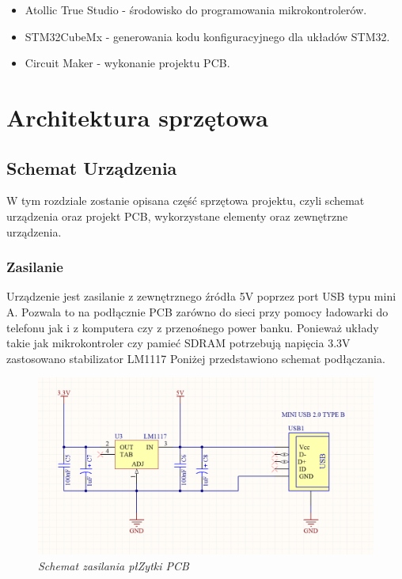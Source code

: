 \documentclass[eng,printmode]{mgr}
\begin{document}
\begin{itemize}
  \item Atollic True Studio - środowisko do programowania mikrokontrolerów.
  \item STM32CubeMx - generowania kodu konfiguracyjnego dla układów STM32.
  \item Circuit Maker - wykonanie projektu PCB.
\end{itemize}

\chapter{ Architektura sprzętowa}



\section{ Schemat Urządzenia}
W tym rozdziale zostanie opisana czę\'s\'c sprzętowa projektu, czyli schemat urządzenia oraz projekt PCB, wykorzystane elementy oraz zewnętrzne urządzenia.
\subsection{Zasilanie}
Urządzenie jest zasilanie z zewnętrznego źródła 5V poprzez port USB typu mini A. Pozwala to na podłącznie PCB zarówno do sieci przy pomocy ładowarki do telefonu jak i z komputera czy z przenośnego power banku. Ponieważ układy takie jak mikrokontroler czy pamieć SDRAM potrzebują napięcia 3.3V zastosowano stabilizator LM1117 Poniżej przedstawiono schemat podłączania.

\begin{figure}[!h]
    \centering
    \includegraphics[width=\textwidth]{schematics/power.png}
    \caption{\textit{\scriptsize Schemat zasilania płZytki PCB}}
\end{figure}
\end{document}
